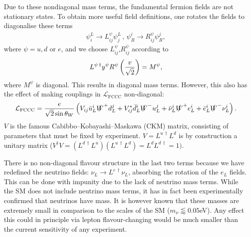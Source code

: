Due to these nondiagonal mass terms, the fundamental fermion fields are not stationary states. To obtain more useful field definitions, one rotates the fields to diagonalise these terms
\begin{align}
  \psi^L_i\to L^{\psi}_{ij} \psi^L_j \,,\, \psi_R^i \to R^{\psi}_{ij} \psi_R^j,
\end{align}
where $\psi=u,d$ or $e$, and we choose $L^{\psi}_{ij}$,$R^{\psi}_{ij}$ according to
\begin{align}
  L^{\psi\,\dagger} y^{\psi} R^{\psi} \left({v\over \sqrt{2}}\right)= M^{\psi},
\end{align}
where $M^{\psi}$ is diagonal. This results in diagonal mass terms. However, this also has the effect of making couplings in $\mathcal{L}_{\text{FCCC}}$ non-diagonal:
\begin{align}
  \mathcal{L}_{\text{FCCC}} = {e\over \sqrt{2}\sin\theta_W} \left( V_{ij} \bar{u}_L^i \slashed{W}^+  d_L^j + V_{ij}^* \bar{d}_L^i \slashed{W}^- u_L^j + \bar{\nu}_L^i \slashed{W}^+ e_L^i + \bar{e}_L^i \slashed{W}^- \nu_L^i \right).
  \label{eq:FCCC}
\end{align}
 $V$ is the famous Cabibbo–Kobayashi–Maskawa (CKM) matrix, consisting of parameters that must be fixed by experiment. $V = L^{u\,\dagger} L^d$ is by construction a unitary matrix ($V^{\dagger}V = (L^{d\,\dagger} L^u)(L^{u\,\dagger} L^d) = L^d L^{d\,\dagger} = 1)$.

There is no non-diagonal flavour structure in the last two terms because we have redefined the neutrino fields: $\nu_L \to L^{e\,\dagger} \nu_L$, absorbing the rotation of the $e_L$ fields. This can be done with impunity due to the lack of neutrino mass terms. While the SM does not include neutrino mass terms, it has in fact been experimentally confirmed that neutrinos have mass. It is however known that these masses are extremely small in comparison to the scales of the SM ($m_{\nu}\lessapprox 0.05$eV). Any effect this could in principle via lepton flavour-changing would be much smaller than the current sensitivity of any experiment. %

